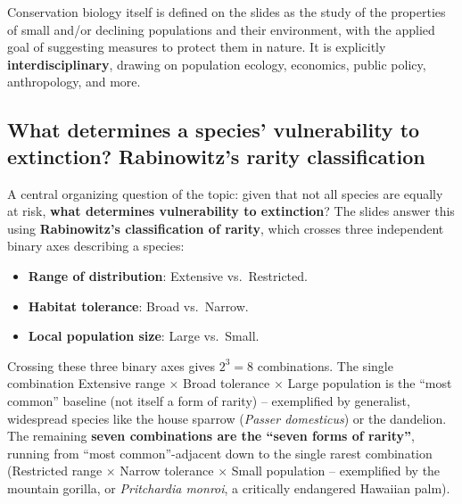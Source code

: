 \documentclass[11pt,a4paper]{article}
\begin{document}
Conservation biology itself is defined on the slides as the study of the properties of small and/or declining populations and their environment, with the applied goal of suggesting measures to protect them in nature. It is explicitly \textbf{interdisciplinary}, drawing on population ecology, economics, public policy, anthropology, and more.

\subsection{What determines a species' vulnerability to extinction? Rabinowitz's rarity classification}
A central organizing question of the topic: given that not all species are equally at risk, \textbf{what determines vulnerability to extinction}? The slides answer this using \textbf{Rabinowitz's classification of rarity}, which crosses three independent binary axes describing a species:
\begin{itemize}[leftmargin=1.5em]
\item \textbf{Range of distribution}: Extensive vs.\ Restricted.
\item \textbf{Habitat tolerance}: Broad vs.\ Narrow.
\item \textbf{Local population size}: Large vs.\ Small.
\end{itemize}
Crossing these three binary axes gives $2^3=8$ combinations. The single combination Extensive range $\times$ Broad tolerance $\times$ Large population is the ``most common'' baseline (not itself a form of rarity) -- exemplified by generalist, widespread species like the house sparrow (\emph{Passer domesticus}) or the dandelion. The remaining \textbf{seven combinations are the ``seven forms of rarity''}, running from ``most common''-adjacent down to the single rarest combination (Restricted range $\times$ Narrow tolerance $\times$ Small population -- exemplified by the mountain gorilla, or \emph{Pritchardia monroi}, a critically endangered Hawaiian palm).
\end{document}
